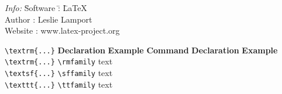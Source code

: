 \documentclass[a4paper]{article}
\newcommand{\head}[1]{\textbf{#1}}
\begin{document}
\begin{tabbing}
    \emph{Info:} \= Software \= : \= \LaTeX\\
                 \> Author   \> : \> Leslie Lamport\\
                 \> Website  \> : \> www.latex-project.org
\end{tabbing}

\begin{tabbing}
    \= \verb|\textrm{...}| \= \head{Declaration} \= \head{Example}\kill
    \> \head{Command}      \> \head{Declaration} \> \head{Example}\\ 
    \> \verb|\textrm{...}| \> \verb|\rmfamily|   \> \rmfamily text\\
    \> \verb|\textsf{...}| \> \verb|\sffamily|   \> \sffamily text\\
    \> \verb|\texttt{...}| \> \verb|\ttfamily|   \> \ttfamily text
\end{tabbing}
\end{document}
